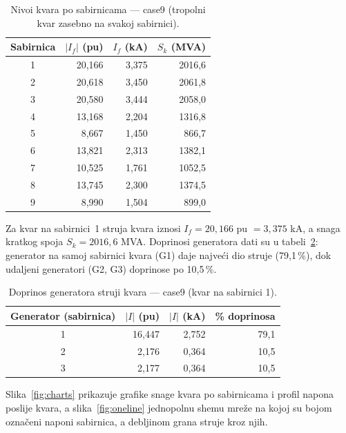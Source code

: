 \documentclass[12pt,a4paper]{article}
\begin{document}
\begin{table}[H]
  \centering
  \caption{Nivoi kvara po sabirnicama --- case9 (tropolni kvar zasebno na svakoj sabirnici).}
  \label{tab:fault}
  \begin{tabular}{crrr}
    \toprule
    Sabirnica & $|I_f|$ (pu) & $I_f$ (kA) & $S_k$ (MVA)\\
    \midrule
    1 & 20{,}166 & 3{,}375 & 2016{,}6\\
    2 & 20{,}618 & 3{,}450 & 2061{,}8\\
    3 & 20{,}580 & 3{,}444 & 2058{,}0\\
    4 & 13{,}168 & 2{,}204 & 1316{,}8\\
    5 &  8{,}667 & 1{,}450 &  866{,}7\\
    6 & 13{,}821 & 2{,}313 & 1382{,}1\\
    7 & 10{,}525 & 1{,}761 & 1052{,}5\\
    8 & 13{,}745 & 2{,}300 & 1374{,}5\\
    9 &  8{,}990 & 1{,}504 &  899{,}0\\
    \bottomrule
  \end{tabular}
\end{table}

Za kvar na sabirnici~1 struja kvara iznosi $I_f = 20{,}166$ pu $=3{,}375$ kA, a
snaga kratkog spoja $S_k = 2016{,}6$ MVA. Doprinosi generatora dati su u
tabeli~\ref{tab:gen}: generator na samoj sabirnici kvara (G1) daje najveći dio
struje (79{,}1\,\%), dok udaljeni generatori (G2, G3) doprinose po 10{,}5\,\%.

\begin{table}[H]
  \centering
  \caption{Doprinos generatora struji kvara --- case9 (kvar na sabirnici 1).}
  \label{tab:gen}
  \begin{tabular}{crrr}
    \toprule
    Generator (sabirnica) & $|I|$ (pu) & $|I|$ (kA) & \% doprinosa\\
    \midrule
    1 & 16{,}447 & 2{,}752 & 79{,}1\\
    2 &  2{,}176 & 0{,}364 & 10{,}5\\
    3 &  2{,}177 & 0{,}364 & 10{,}5\\
    \bottomrule
  \end{tabular}
\end{table}

Slika~\ref{fig:charts} prikazuje grafike snage kvara po sabirnicama i profil
napona poslije kvara, a slika~\ref{fig:oneline} jednopolnu shemu mreže na kojoj
su bojom označeni naponi sabirnica, a debljinom grana struje kroz njih.
\end{document}

